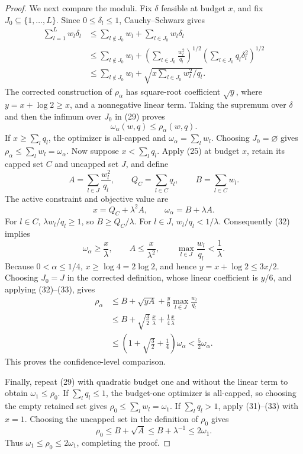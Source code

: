 \documentclass{article}
\begin{document}
\begin{proof}
We next compare the moduli. Fix \(\delta\) feasible at budget \(x\), and fix \(J_0\subseteq\{1,\ldots,L\}\). Since \(0\le\delta_l\le1\), Cauchy--Schwarz gives
\[
\begin{aligned}
 \sum_{l=1}^Lw_l\delta_l
 &\le\sum_{l\notin J_0}w_l+
      \sum_{l\in J_0}w_l\delta_l\\
 &\le\sum_{l\notin J_0}w_l+
 \left(\sum_{l\in J_0}\frac{w_l^2}{q_l}\right)^{1/2}
 \left(\sum_{l\in J_0}q_l\delta_l^2\right)^{1/2}\\
 &\le\sum_{l\notin J_0}w_l+
 \sqrt{x\sum_{l\in J_0}w_l^2/q_l}.
\end{aligned}
\tag{29}
\]
The corrected construction of \(\rho_\alpha\) has square-root coefficient \(\sqrt y\), where \(y=x+\log2\ge x\), and a nonnegative linear term. Taking the supremum over \(\delta\) and then the infimum over \(J_0\) in (29) proves
\[
 \omega_\alpha(w,q)\le\rho_\alpha(w,q).
\tag{30}
\]
If \(x\ge\sum_lq_l\), the optimizer is all-capped and \(\omega_\alpha=\sum_lw_l\). Choosing \(J_0=\varnothing\) gives \(\rho_\alpha\le\sum_lw_l=\omega_\alpha\). Now suppose \(x<\sum_lq_l\). Apply (25) at budget \(x\), retain its capped set \(C\) and uncapped set \(J\), and define
\[
 A=\sum_{l\in J}\frac{w_l^2}{q_l},\qquad
 Q_C=\sum_{l\in C}q_l,\qquad
 B=\sum_{l\in C}w_l.
\tag{31}
\]
The active constraint and objective value are
\[
 x=Q_C+\lambda^2A,
 \qquad
 \omega_\alpha=B+\lambda A.
\tag{32}
\]
For \(l\in C\), \(\lambda w_l/q_l\ge1\), so \(B\ge Q_C/\lambda\). For \(l\in J\), \(w_l/q_l<1/\lambda\). Consequently (32) implies
\[
 \omega_\alpha\ge\frac{x}{\lambda},
 \qquad A\le\frac{x}{\lambda^2},
 \qquad \max_{l\in J}\frac{w_l}{q_l}<\frac1\lambda.
\tag{33}
\]
Because \(0<\alpha\le1/4\), \(x\ge\log4=2\log2\), and hence \(y=x+\log2\le3x/2\). Choosing \(J_0=J\) in the corrected definition, whose linear coefficient is \(y/6\), and applying (32)--(33), gives
\[
\begin{aligned}
 \rho_\alpha
 &\le B+\sqrt{yA}+\frac y6\max_{l\in J}\frac{w_l}{q_l}\\
 &\le B+\sqrt{\frac32}\,\frac{x}{\lambda}
       +\frac14\frac{x}{\lambda}\\
 &\le\left(1+\sqrt{\frac32}+\frac14\right)\omega_\alpha
 <\frac52\omega_\alpha.
\end{aligned}
\tag{34}
\]
This proves the confidence-level comparison.

Finally, repeat (29) with quadratic budget one and without the linear term to obtain \(\omega_1\le\rho_0\). If \(\sum_lq_l\le1\), the budget-one optimizer is all-capped, so choosing the empty retained set gives \(\rho_0\le\sum_lw_l=\omega_1\). If \(\sum_lq_l>1\), apply (31)--(33) with \(x=1\). Choosing the uncapped set in the definition of \(\rho_0\) gives
\[
 \rho_0\le B+\sqrt A
 \le B+\lambda^{-1}
 \le2\omega_1.
\tag{35}
\]
Thus \(\omega_1\le\rho_0\le2\omega_1\), completing the proof.
\end{proof}
\end{document}
